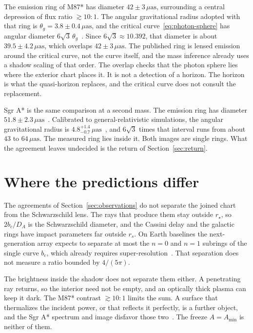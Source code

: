 \documentclass[a4paper]{article}
\begin{document}
The emission ring of M87* has diameter \(42\pm 3\,\mu\mathrm{as}\), surrounding a central depression of flux ratio \(\gtrsim 10{:}1\). The angular gravitational radius adopted with that ring is \(\theta_g=3.8\pm 0.4\,\mu\mathrm{as}\), and the critical curve~\eqref{eq:photon-sphere} has angular diameter \(6\sqrt{3}\,\theta_g\)~\cite{EHT2019}. Since \(6\sqrt{3}\approx 10.392\), that diameter is about \(39.5\pm 4.2\,\mu\mathrm{as}\), which overlaps \(42\pm 3\,\mu\mathrm{as}\). The published ring is lensed emission around the critical curve, not the curve itself, and the mass inference already uses a shadow scaling of that order. The overlap checks that the photon sphere lies where the exterior chart places it. It is not a detection of a horizon. The horizon is what the quasi-horizon replaces, and the critical curve does not consult the replacement.

Sgr A* is the same comparison at a second mass. The emission ring has diameter \(51.8\pm 2.3\,\mu\mathrm{as}\)~\cite{EHT2022I}. Calibrated to general-relativistic simulations, the angular gravitational radius is \(4.8^{+1.4}_{-0.7}\,\mu\mathrm{as}\)~\cite{EHT2022IV}, and \(6\sqrt{3}\) times that interval runs from about \(43\) to \(64\,\mu\mathrm{as}\). The measured ring lies inside it. Both images are single rings. What the agreement leaves undecided is the return of Section~\ref{sec:return}.

\section{Where the predictions differ}
\label{sec:discriminants}

The agreements of Section~\ref{sec:observations} do not separate the joined chart from the Schwarzschild lens. The rays that produce them stay outside \(r_\star\), so \(2b_c/D_A\) is the Schwarzschild diameter, and the Cassini delay and the galactic rings have impact parameters far outside \(r_s\). On Earth baselines the next-generation array expects to separate at most the \(n=0\) and \(n=1\) subrings of the single curve \(b_c\), which already requires super-resolution~\cite{Johnson2023}. That separation does not measure a ratio bounded by \(4/(5\pi)\).

The brightness inside the shadow does not separate them either. A penetrating ray returns, so the interior need not be empty, and an optically thick plasma can keep it dark. The M87* contrast \(\gtrsim 10{:}1\) limits the sum. A surface that thermalizes the incident power, or that reflects it perfectly, is a further object, and the Sgr A* spectrum and image disfavor those two~\cite{EHT2022VI}. The freeze \(A=A_{\min}\) is neither of them.
\end{document}
